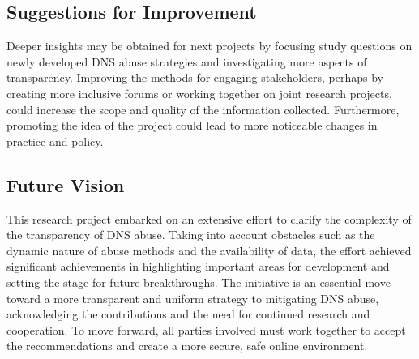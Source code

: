 \subsection{Suggestions for Improvement}

Deeper insights may be obtained for next projects by focusing study questions on newly developed DNS abuse strategies and investigating more aspects of transparency. Improving the methods for engaging stakeholders, perhaps by creating more inclusive forums or working together on joint research projects, could increase the scope and quality of the information collected. Furthermore, promoting the idea of the project could lead to more noticeable changes in practice and policy.

\subsection{Future Vision}

This research project embarked on an extensive effort to clarify the complexity of the transparency of DNS abuse. Taking into account obstacles such as the dynamic nature of abuse methods and the availability of data, the effort achieved significant achievements in highlighting important areas for development and setting the stage for future breakthroughs. The initiative is an essential move toward a more transparent and uniform strategy to mitigating DNS abuse, acknowledging the contributions and the need for continued research and cooperation. To move forward, all parties involved must work together to accept the recommendations and create a more secure, safe online environment.
